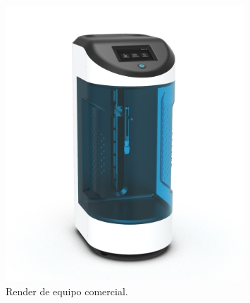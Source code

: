 \begin{itemize}
\begin{figure}[h!]
	\centering
	\includegraphics[width=0.8\textwidth]{./Figures/new_dip.png}
	\caption{Render de equipo comercial.}
	\label{fig:new_dip}
\end{figure}

\end{itemize}



